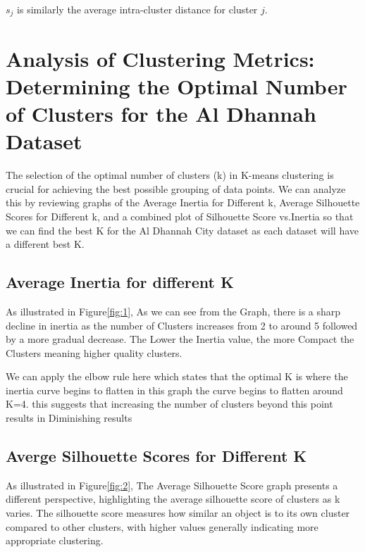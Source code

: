 $s_j$ is similarly the average intra-cluster distance for cluster $j$.

\section{Analysis of Clustering Metrics: Determining the Optimal Number of Clusters for the Al Dhannah Dataset}\label{sec:analysis-of-clustering-metrics:-determining-the-optimal-number-of-clusters-for-the-al-dhannah-dataset}

The selection of the optimal number of clusters (k) in K-means clustering is crucial for achieving the best possible grouping of data points.
We can analyze this by reviewing graphs of the Average Inertia for Different k, Average Silhouette Scores for Different k,
and a combined plot of Silhouette Score vs.Inertia so that we can find the best K for the Al Dhannah City dataset as each
dataset will have a different best K\@.

\subsection{Average Inertia for different K}\label{subsec:average-inertia-for-different-k}



As illustrated in Figure\ref{fig:1}, As we can see from the Graph, there is a sharp decline in inertia as the number of Clusters increases from 2 to around 5 followed
by a more gradual decrease.
The Lower the Inertia value, the more Compact the Clusters meaning higher quality clusters.

We can apply the elbow rule here which states that the optimal K is where the inertia curve begins to flatten in this graph the
curve begins to flatten around K=4.
this suggests that increasing the number of clusters beyond this point results in Diminishing results


\subsection{Averge Silhouette Scores for Different K}\label{subsec:averge-silhouette-scores-for-different-k}



As illustrated in Figure\ref{fig:2}, The Average Silhouette Score graph presents a different perspective, highlighting the average silhouette score of clusters as k varies.
The silhouette score measures how similar an object is to its own cluster compared to other clusters, with higher values generally indicating more appropriate clustering.

